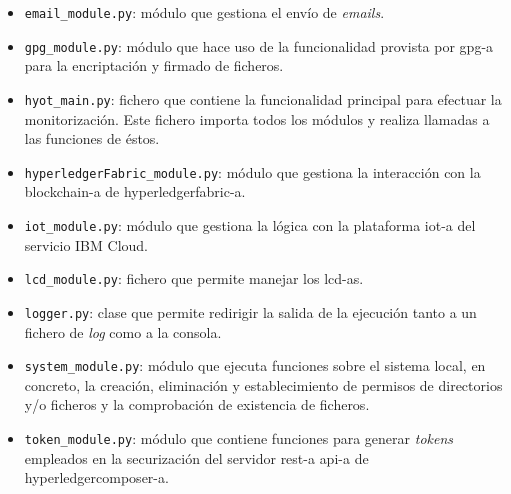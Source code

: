 \documentclass[12pt,a4paper, twoside]{report}
\begin{document}
\begin{itemize}
\begin{itemize}
			\item \texttt{email\_module.py}: módulo que gestiona el envío de \textit{emails}.
			\item \texttt{gpg\_module.py}: módulo que hace uso de la funcionalidad provista por \gls{gpg-a} para la encriptación y firmado de ficheros.
			\item \texttt{hyot\_main.py}: fichero que contiene la funcionalidad principal para efectuar la monitorización. Este fichero importa todos los módulos y realiza llamadas a las funciones de éstos. 
			\item \texttt{hyperledgerFabric\_module.py}: módulo que gestiona la interacción con la \gls{blockchain-a} de \gls{hyperledgerfabric-a}.
			\item \texttt{iot\_module.py}: módulo que gestiona la lógica con la plataforma \gls{iot-a} del servicio IBM Cloud.
			\item \texttt{lcd\_module.py}: fichero que permite manejar los \glspl{lcd-a}.
			\item \texttt{logger.py}: clase que permite redirigir la salida de la ejecución tanto a un fichero de \textit{log} como a la consola.
			\item \texttt{system\_module.py}: módulo que ejecuta funciones sobre el sistema local, en concreto, la creación, eliminación y establecimiento de permisos de directorios y/o ficheros y la comprobación de existencia de ficheros.
			\item \texttt{token\_module.py}: módulo que contiene funciones para generar \textit{\glspl{token}} empleados en la securización del servidor \gls{rest-a} \gls{api-a} de \gls{hyperledgercomposer-a}.
		\end{itemize}
		

\end{itemize}
\end{document}
